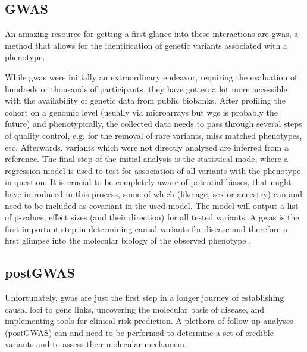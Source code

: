     \subsection{GWAS}
    \label{subsec:gwas_general}
    An amazing resource for getting a first glance into these interactions are \ac{gwas}, a method that allows for the identification of genetic variants associated with a phenotype.

    While \ac{gwas} were initially an extraordinary endeavor, requiring the evaluation of hundreds or thousands of participants, they have gotten a lot more accessible with the availability of genetic data from public biobanks. After profiling the cohort on a genomic level (usually via microarrays but \ac{wgs} is probably the future) and phenotypically, the collected data needs to pass through several steps of quality control, e.g. for the removal of rare variants, miss matched phenotypes, etc. Afterwards, variants which were not directly analyzed are inferred from a reference. The final step of the initial analysis is the statistical mode, where a regression model is used to test for association of all variants with the phenotype in question. It is crucial to be completely aware of potential biases, that might have introduced in this process, some of which (like  age, sex or ancestry) can and need to be included as covariant in the used model. \cite{uffelmannGenomewideAssociationStudies2021, flintGWAS2013} The model will output a list of p-values, effect sizes (and their direction) for all tested variants. A \ac{gwas} is the first important step in determining causal variants for disease and therefore a first glimpse into the molecular biology of the observed phenotype \cite{uffelmannGenomewideAssociationStudies2021}.

    \subsection{postGWAS}
    \label{subsec:gwas_limit}
    Unfortunately, \ac{gwas} are just the first step in a longer journey of establishing causal loci to gene links, uncovering the molecular basis of disease, and implementing tools for clinical risk prediction. A plethora of follow-up analyses (postGWAS) can and need to be performed to determine a set of credible variants and to assess their molecular mechanism.


